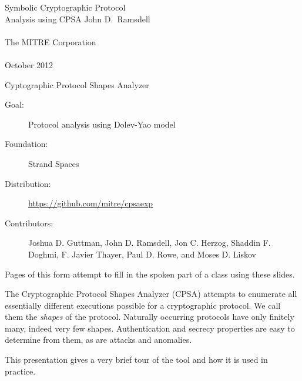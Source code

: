 \documentclass[landscape]{slides}
\newcommand{\cpsa}{CPSA}
\begin{document}
\begin{titleslide}{Symbolic Cryptographic Protocol \\ Analysis using CPSA}
%
John D.~Ramsdell\\
~\\
The MITRE Corporation\\
~\\
October 2012
\end{titleslide}

\begin{mitreslide}{Cyptographic Protocol Shapes Analyzer}
\begin{description}
\item [Goal:] Protocol analysis using Dolev-Yao model
\item [Foundation:] Strand Spaces
\item [Distribution:] \url{https://github.com/mitre/cpsaexp}
\item [Contributors:]
  Joshua D. Guttman, John D. Ramsdell, Jon C. Herzog, Shaddin
  F. Doghmi, F. Javier Thayer, Paul D. Rowe, and Moses D. Liskov
\end{description}
\end{mitreslide}

\begin{note}
  Pages of this form attempt to fill in the spoken part of a
  class using these slides.

  The Cryptographic Protocol Shapes Analyzer ({\cpsa}) attempts to
  enumerate all essentially different executions possible for a
  cryptographic protocol. We call them the \emph{shapes} of the
  protocol. Naturally occurring protocols have only finitely many,
  indeed very few shapes. Authentication and secrecy properties are
  easy to determine from them, as are attacks and anomalies.

  This presentation gives a very brief tour of the tool and how it is
  used in practice.
\end{note}
\end{document}
